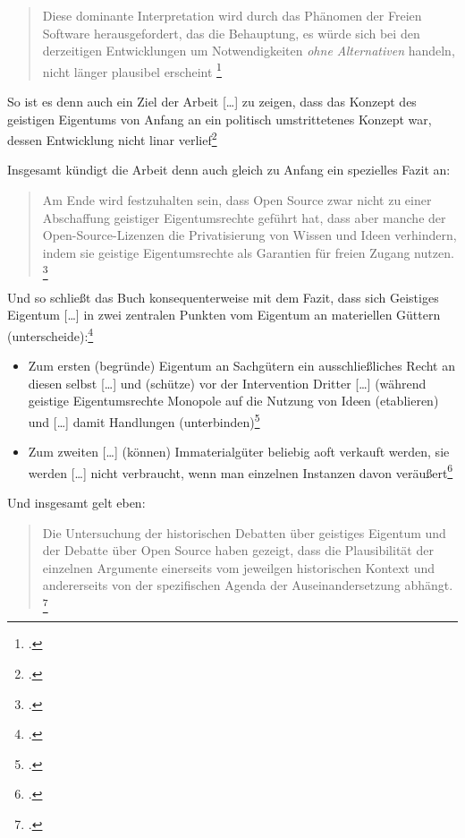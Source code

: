 \documentclass[DIV=calc,BCOR=5mm,11pt,headings=small,oneside,abstract=true, toc=bib]{scrartcl}
\begin{document}
\begin{quote}
\glqq{}Diese dominante Interpretation wird durch das Phänomen der Freien
Software herausgefordert, das die Behauptung, es würde sich bei den derzeitigen
Entwicklungen um Notwendigkeiten \emph{ohne Alternativen} handeln, nicht länger
plausibel erscheint
\grqq{}\footcite[][9; herv.i.O]{Eckl2004a}
\end{quote}

So ist es denn auch ein \glqq{}Ziel\grqq{} der Arbeit \glqq{}[\ldots] zu
zeigen, dass das Konzept des geistigen Eigentums von Anfang an ein
politisch umstrittetenes Konzept war, dessen Entwicklung nicht linar
verlief\grqq{}\footcite[vgl.][12]{Eckl2004a}

Insgesamt kündigt die Arbeit denn auch gleich zu Anfang ein spezielles Fazit an:

\begin{quote}
\glqq{}Am Ende wird festzuhalten sein, dass Open Source zwar nicht zu einer
Abschaffung geistiger Eigentumsrechte geführt hat, dass aber manche der
Open-Source-Lizenzen die Privatisierung von Wissen und Ideen verhindern, indem
sie geistige Eigentumsrechte als Garantien für freien Zugang nutzen.
\grqq{}\footcite[][14]{Eckl2004a}
\end{quote}

Und so schließt das Buch konsequenterweise mit dem Fazit, dass sich
\glqq{}Geistiges Eigentum [\ldots] in zwei zentralen Punkten vom Eigentum
an materiellen Güttern (unterscheide)\grqq{}:\footcite[][139]{Eckl2004a}
\begin{itemize}
  \item Zum ersten \glqq{}(begründe) Eigentum an Sachgütern ein ausschließliches
  Recht an diesen selbst [\ldots] und (schütze) vor der Intervention Dritter
  [\ldots] (während geistige Eigentumsrechte Monopole auf die Nutzung von Ideen
  (etablieren) und [\ldots] damit Handlungen
  (unterbinden)\grqq{}\footcite[][139]{Eckl2004a}
  \item Zum zweiten \glqq{}[\ldots] (können) Immaterialgüter beliebig
  aoft verkauft werden\grqq{}, sie werden \glqq{}[\ldots] nicht
  verbraucht, wenn man einzelnen Instanzen davon
  veräußert\grqq{}\footcite[][139]{Eckl2004a}
\end{itemize}

Und insgesamt gelt eben:

\begin{quote}
\glqq{}Die Untersuchung der historischen Debatten über geistiges Eigentum und
der Debatte über Open Source haben gezeigt, dass die Plausibilität der einzelnen
Argumente einerseits vom jeweilgen historischen Kontext und andererseits von der
spezifischen Agenda der Auseinandersetzung abhängt.
\grqq{}\footcite[][140]{Eckl2004a}
\end{quote}
\end{document}
